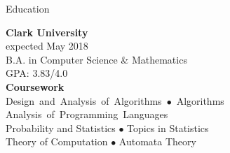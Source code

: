 \documentclass{resume} %
\newcommand{\mybullet}[0]{\textcolor{mygray}{$\bullet$} }
\begin{document}

\begin{rSection}{Education}

\color{jobcolor}
\begin{vwcol}[widths={0.45, 0.55}, indent=0pt, rule=0pt]
\textcolor{jobcolor}{\textbf{Clark University}}\\
\textcolor{mygray}{expected May 2018} \\
B.A. in Computer Science \& Mathematics \\
GPA: 3.83/4.0  \smallskip \\

\textcolor{jobcolor}{\textbf{Coursework}} \\ \mbox{Design and Analysis of Algorithms \mybullet Algorithms}\\
\mbox{Analysis of Programming Languages}\\ Probability and Statistics \mybullet Topics in Statistics\\
Theory of Computation \mybullet Automata Theory

\end{vwcol}

\end{rSection}

\end{document}
